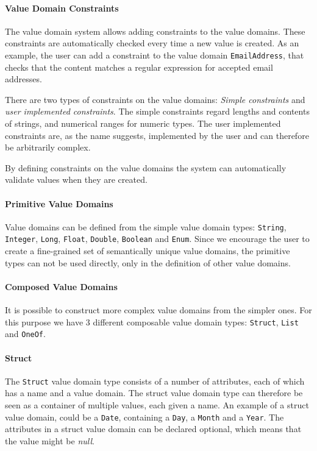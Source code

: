 \paragraph{Value Domain Constraints}

The value domain system allows adding constraints to the value domains.
These constraints are automatically checked every time a new value
is created. As an example, the user can add a constraint to the value
domain \texttt{EmailAddress}, that checks that the content matches
a regular expression for accepted email addresses. 

There are two types of constraints on the value domains: \emph{Simple
constraints} and \emph{user implemented constraints}. The simple constraints
regard lengths and contents of strings, and numerical ranges for numeric
types. The user implemented constraints are, as the name suggests,
implemented by the user and can therefore be arbitrarily complex.

By defining constraints on the value domains the system can automatically
validate values when they are created.


\paragraph{Primitive Value Domains}

Value domains can be defined from the simple value domain types: \texttt{String},
\texttt{Integer}, \texttt{Long}, \texttt{Float}, \texttt{Double},
\texttt{Boolean} and \texttt{Enum}. Since we encourage the user to
create a fine-grained set of semantically unique value domains, the
primitive types can not be used directly, only in the definition of
other value domains.


\paragraph{Composed Value Domains}

It is possible to construct more complex value domains from the simpler
ones. For this purpose we have 3 different composable value domain
types: \texttt{Struct}, \texttt{List} and \texttt{OneOf}.


\paragraph{Struct}

The \texttt{Struct} value domain type consists of a number of attributes,
each of which has a name and a value domain. The struct value domain
type can therefore be seen as a container of multiple values, each
given a name. An example of a struct value domain, could be a \texttt{Date},
containing a \texttt{Day}, a \texttt{Month} and a \texttt{Year}. The
attributes in a struct value domain can be declared optional, which
means that the value might be \emph{null}.


